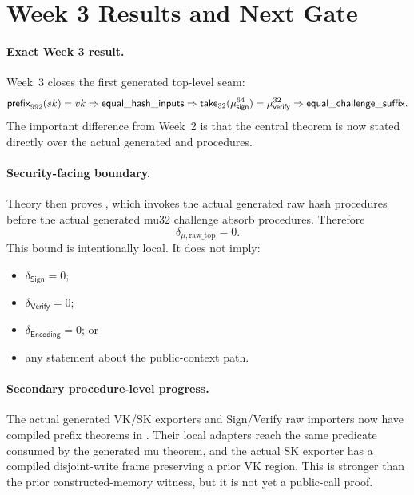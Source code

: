 \section{Week 3 Results and Next Gate}
\label{sec:week3-results}

\paragraph{Exact Week 3 result.}
Week~3 closes the first generated top-level seam:
\[
  \mathsf{prefix}_{992}(sk)=vk
  \Rightarrow
  \mathsf{equal\_hash\_inputs}
  \Rightarrow
  \mathsf{take}_{32}(\mu_{\mathsf{sign}}^{64})
  =
  \mu_{\mathsf{verify}}^{32}
  \Rightarrow
  \mathsf{equal\_challenge\_suffix}.
\]
The important difference from Week~2 is that the central theorem is now stated
directly over the actual generated
 and  procedures.

\paragraph{Security-facing boundary.}
Theory  then proves
, which
invokes the actual generated raw hash procedures before the actual generated
mu32 challenge absorb procedures. Therefore
\[
  \delta_{\mu,\mathrm{raw\_top}} = 0.
\]
This bound is intentionally local. It does not imply:
\begin{itemize}
  \item \(\delta_{\mathsf{Sign}} = 0\);
  \item \(\delta_{\mathsf{Verify}} = 0\);
  \item \(\delta_{\mathsf{Encoding}} = 0\); or
  \item any statement about the public-context path.
\end{itemize}

\paragraph{Secondary procedure-level progress.}
The actual generated VK/SK exporters and Sign/Verify raw importers now have
compiled prefix theorems in .  Their local
adapters reach the same  predicate consumed by
the generated mu theorem, and the actual SK exporter has a compiled
disjoint-write frame preserving a prior VK region.  This is stronger than the
prior constructed-memory witness, but it is not yet a public-call proof.

